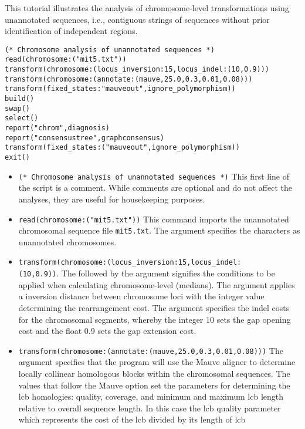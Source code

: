 This tutorial illustrates the analysis of chromosome-level transformations using 
unannotated sequences, i.e., contiguous strings of sequences without prior 
identification of independent regions. 

\begin{verbatim}
(* Chromosome analysis of unannotated sequences *)
read(chromosome:("mit5.txt"))
transform(chromosome:(locus_inversion:15,locus_indel:(10,0.9)))
transform(chromosome:(annotate:(mauve,25.0,0.3,0.01,0.08)))
transform(fixed_states:"mauveout",ignore_polymorphism))
build()
swap()
select()
report("chrom",diagnosis)
report("consensustree",graphconsensus)
transform(fixed_states:("mauveout",ignore_polymorphism))
exit()
\end{verbatim}

\begin{itemize}
\item \texttt{(* Chromosome analysis of unannotated sequences *)} This first line of the script is a comment. While 
comments are optional and do not affect the analyses, they are useful for housekeeping purposes.
\item \texttt{read(chromosome:("mit5.txt"))} This command imports the unannotated chromosomal sequence file 
\texttt{mit5.txt}. The argument  specifies the characters as unannotated chromosomes.
\item \texttt{transform(chromosome:(locus\_inversion:15,locus\_indel:\\(10,0.9))}.  The  
followed by the argument  signifies the conditions to be applied when calculating 
chromosome-level (medians).  The argument  applies a inversion distance 
between chromosome loci with the integer value determining the rearrangement cost. The argument 
 specifies the indel costs for the chromosomal segments, whereby the integer 10 
sets the gap opening cost and the float 0.9 sets the gap extension cost.
\item \texttt{transform(chromosome:(annotate:(mauve,25.0,0.3,0.01,0.08)))} The argument  specifies that the program will use the Mauve aligner \cite{darlingetal2004} to determine locally collinear 
homologous blocks within the chromosomal sequences.  The values that follow the Mauve option set the parameters 
for determining the lcb homologies: quality, coverage, and minimum and maximum lcb length relative to overall 
sequence length. In this case the lcb quality parameter which represents the cost of the lcb divided by its length of lcb 

\end{itemize}
